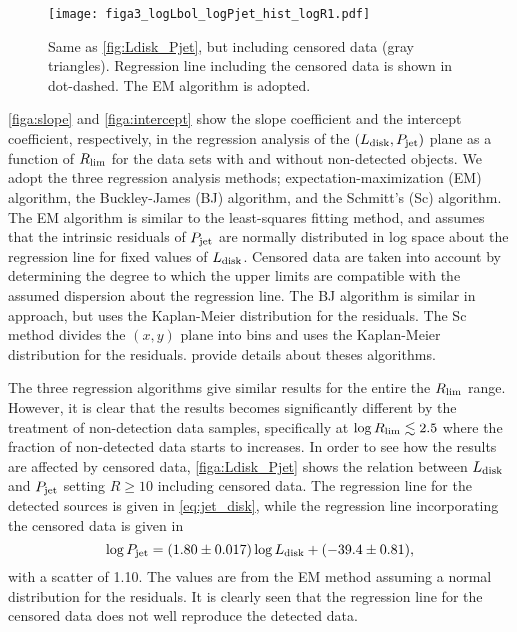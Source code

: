 \documentclass[preprint2,twocolappendix]{aastex6}
\begin{document}
\begin{figure}[t]
 \begin{center}
  \texttt{[image: figa3\_logLbol\_logPjet\_hist\_logR1.pdf]} 
 \end{center}
\caption{Same as \autoref{fig:Ldisk_Pjet}, but including censored data (gray triangles). Regression line including the censored data is shown in dot-dashed. The EM algorithm is adopted.}\label{figa:Ldisk_Pjet}
\end{figure}


\autoref{figa:slope} and \autoref{figa:intercept} show the slope coefficient and the intercept coefficient, respectively, in the regression analysis of the $(L_{\rm disk}, P_{\rm jet})$ plane as a function of $R_{\rm lim}$ for the data sets with and without non-detected objects. We adopt the three regression analysis methods; expectation-maximization (EM) algorithm, the Buckley-James (BJ) algorithm, and the Schmitt's (Sc) algorithm. The EM algorithm is similar to the least-squares fitting method, and assumes that the intrinsic residuals of $P_{\rm jet}$ are normally distributed in log space about the regression line for fixed values of $L_{\rm disk}$. Censored data are taken into account by determining the degree to which the upper limits are compatible with the assumed dispersion about the regression line. The BJ algorithm is similar in approach, but uses the Kaplan-Meier distribution for the residuals. The Sc method divides the $(x,y)$ plane into bins and uses the Kaplan-Meier distribution for the residuals. \citet{iso86} provide details about theses algorithms.

The three regression algorithms give similar results for the entire the $R_{\rm lim}$ range. However, it is clear that the results becomes significantly different by the treatment of non-detection data samples, specifically at $\log R_{\rm lim}\lesssim2.5$ where the fraction of non-detected data starts to increases. In order to see how the results are affected by censored data, \autoref{figa:Ldisk_Pjet} shows the relation between $L_{\rm disk}$ and $P_{\rm jet}$ setting $R\geq10$ including censored data. The regression line for the detected sources is given in \autoref{eq:jet_disk}, while the regression line incorporating the censored data is given in 
\begin{equation}
\log P_{\rm jet} = (1.80\pm0.017)\log L_{\rm disk} + (-39.4 \pm 0.81),
\end{equation}
with a scatter of 1.10. The values are from the EM method assuming a normal distribution for the residuals. It is clearly seen that the regression line for the censored data does not well reproduce the detected data.
\end{document}
